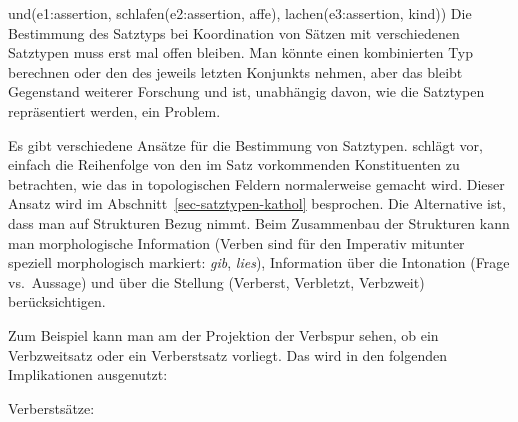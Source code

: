 \ea
und(e1:assertion, schlafen(e2:assertion, affe), lachen(e3:assertion, kind))
\z
Die Bestimmung des Satztyps bei Koordination von Sätzen mit verschiedenen Satztypen muss erst mal
offen bleiben. Man könnte einen kombinierten Typ berechnen oder den des jeweils letzten Konjunkts
nehmen, aber das bleibt Gegenstand weiterer Forschung und ist, unabhängig davon, wie die Satztypen
repräsentiert werden, ein Problem.

Es gibt verschiedene Ansätze für die Bestimmung von Satztypen. \citet{Kathol2000a,Kathol2001a}
schlägt vor, einfach die Reihenfolge von den im Satz vorkommenden Konstituenten zu betrachten, wie
das in topologischen Feldern normalerweise gemacht wird. Dieser Ansatz wird im
Abschnitt~\ref{sec-satztypen-kathol} besprochen. Die Alternative ist, dass man auf Strukturen Bezug
nimmt. Beim Zusammenbau der Strukturen kann man morphologische Information (Verben sind für den
Imperativ mitunter speziell morphologisch markiert: \emph{gib}, \emph{lies}), Information über die
Intonation (Frage vs.\ Aussage) und über die Stellung (Verberst, Verbletzt, Verbzweit) berücksichtigen.
\largerpage

Zum Beispiel kann man am \slashw der Projektion der Verbspur sehen, ob ein Verbzweitsatz oder ein
Verberstsatz vorliegt. Das wird in den folgenden Implikationen ausgenutzt:

\eas
Verberstsätze:\\
 \impl\\
\hfill{}
\zs

